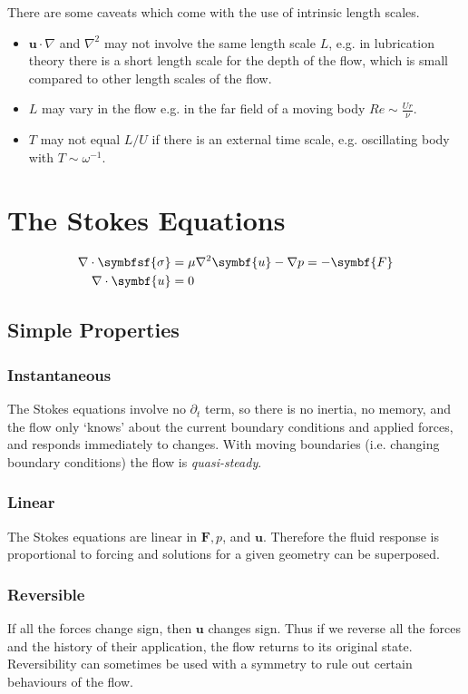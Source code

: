 \documentclass{jknotes}
\begin{document}
There are some caveats which come with the use of intrinsic length scales.
\begin{itemize}
	\item $\symbf{u} \cdot \nabla$ and $\nabla^2$ may not involve the same length
		scale $L$, e.g. in lubrication theory there is a short length scale
		for the depth of the flow, which is small compared to other length
		scales of the flow.
	\item $L$ may vary in the flow e.g. in the far field of a moving body $Re
		\sim \frac{Ur}{\nu}$.
	\item $T$ may not equal $L/U$ if there is an external time scale, e.g.
		oscillating body with $T \sim \omega^{-1}$.
\end{itemize}

\section{The Stokes Equations}
\begin{equation}
	\begin{aligned}
		\nabla \cdot \symbfsf{\sigma} &= \mu \nabla^2 \symbf{u} - \nabla p = - \symbf{F} \\
		\nabla \cdot \symbf{u} &= 0
	\end{aligned}
\end{equation}

\subsection{Simple Properties}
\subsubsection{Instantaneous}
The Stokes equations involve no $\partial_t$ term, so there is no inertia, no
memory, and the flow only `knows' about the current boundary conditions and
applied forces, and responds immediately to changes. With moving boundaries
(i.e. changing boundary conditions) the flow is \emph{quasi-steady}.

\subsubsection{Linear}
The Stokes equations are linear in $\symbf{F}, p$, and $\symbf{u}$. Therefore the
fluid response is proportional to forcing and solutions for a given geometry
can be superposed.

\subsubsection{Reversible}
If all the forces change sign, then $\symbf{u}$ changes sign. Thus if we reverse
all the forces and the history of their application, the flow returns to its
original state. Reversibility can sometimes be used with a symmetry to rule
out certain behaviours of the flow.
\end{document}
